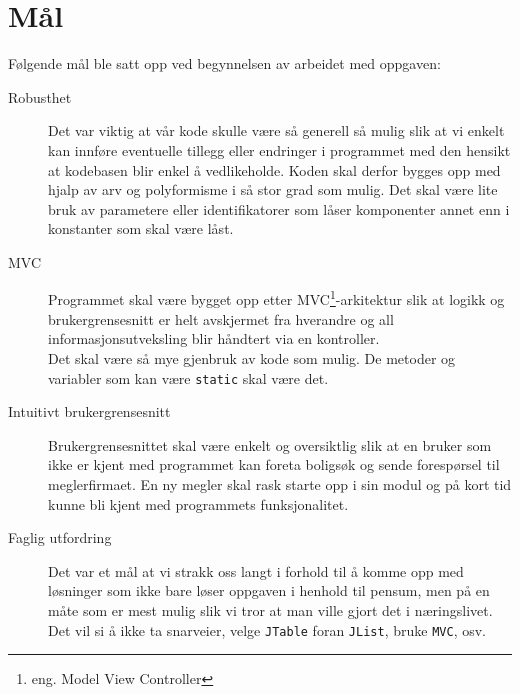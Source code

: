 \section{Mål}
Følgende mål ble satt opp ved begynnelsen av arbeidet med oppgaven:
\begin{description}
\item[Robusthet]
Det var viktig at vår kode skulle være så generell så mulig slik at vi enkelt kan innføre eventuelle tillegg eller endringer i programmet med den hensikt at kodebasen blir enkel å vedlikeholde. Koden skal derfor bygges opp med hjalp av arv og polyformisme i så stor grad som mulig. Det skal være lite bruk av parametere eller identifikatorer som låser komponenter annet enn i konstanter som skal være låst.
\item[MVC]
Programmet skal være bygget opp etter MVC\footnote{eng. Model View Controller}-arkitektur slik at logikk og brukergrensesnitt er helt avskjermet fra hverandre og all informasjonsutveksling blir håndtert via en kontroller. \\
Det skal være så mye gjenbruk av kode som mulig. De metoder og variabler som kan være \texttt{static} skal være det.
\item[Intuitivt brukergrensesnitt]
Brukergrensesnittet skal være enkelt og oversiktlig slik at en bruker som ikke er kjent med programmet kan foreta boligsøk og sende forespørsel til meglerfirmaet. En ny megler skal rask starte opp i sin modul og på kort tid kunne bli kjent med programmets funksjonalitet.
\item[Faglig utfordring]
Det var et mål at vi strakk oss langt i forhold til å komme opp med løsninger som ikke bare løser oppgaven i henhold til pensum, men på en måte som er mest mulig slik vi tror at man ville gjort det i næringslivet. Det vil si å ikke ta snarveier, velge \texttt{JTable} foran \texttt{JList}, bruke \texttt{MVC}, osv.
\end{description}
